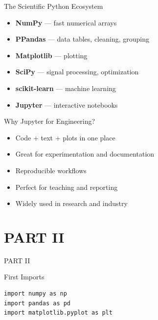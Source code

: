 \documentclass[aspectratio=169]{beamer}
\begin{document}
\begin{frame}{The Scientific Python Ecosystem}
  \begin{itemize}
    \item \textbf{NumPy} — fast numerical arrays
    \item \textbf{PPandas} — data tables, cleaning, grouping
    \item \textbf{Matplotlib} — plotting
    \item \textbf{SciPy} — signal processing, optimization
    \item \textbf{scikit-learn} — machine learning
    \item \textbf{Jupyter} — interactive notebooks
  \end{itemize}
\end{frame}

\begin{frame}{Why Jupyter for Engineering?}
  \begin{itemize}
    \item Code + text + plots in one place
    \item Great for experimentation and documentation
    \item Reproducible workflows
    \item Perfect for teaching and reporting
    \item Widely used in research and industry
  \end{itemize}
\end{frame}

\section{PART II}
\begin{frame}[plain]
  \begin{center}
    \vspace{2cm}
    {\color{white}\Huge PART II}
  \end{center}
\end{frame}

\begin{frame}[fragile]{First Imports}
\begin{verbatim}
import numpy as np
import pandas as pd
import matplotlib.pyplot as plt
\end{verbatim}
\end{frame}
\end{document}
